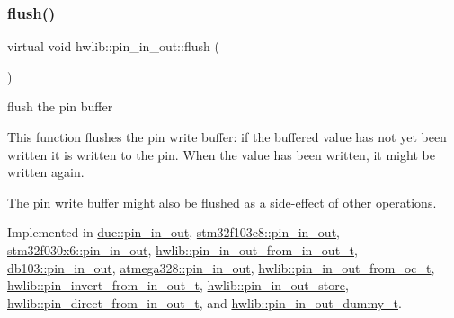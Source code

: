 \subsubsection{\texorpdfstring{flush()}{flush()}}
{\footnotesize\ttfamily virtual void hwlib\+::pin\+\_\+in\+\_\+out\+::flush (\begin{DoxyParamCaption}{ }\end{DoxyParamCaption})\hspace{0.3cm}{\ttfamily [pure virtual]}}

flush the pin buffer

This function flushes the pin write buffer\+: if the buffered value has not yet been written it is written to the pin. When the value has been written, it might be written again.

The pin write buffer might also be flushed as a side-\/effect of other operations. 

Implemented in \hyperlink{classdue_1_1pin__in__out_af138c21a34306d3421e0b961bf9406a1}{due\+::pin\+\_\+in\+\_\+out}, \hyperlink{classstm32f103c8_1_1pin__in__out_aae0b516a0f186e8f6be498af8b1ca238}{stm32f103c8\+::pin\+\_\+in\+\_\+out}, \hyperlink{classstm32f030x6_1_1pin__in__out_a89e04e9a27e2eab76739b4c9195abd34}{stm32f030x6\+::pin\+\_\+in\+\_\+out}, \hyperlink{classhwlib_1_1pin__in__out__from__in__out__t_a652dca78cb01191780f571b7f31e6e77}{hwlib\+::pin\+\_\+in\+\_\+out\+\_\+from\+\_\+in\+\_\+out\+\_\+t}, \hyperlink{classdb103_1_1pin__in__out_a7cfd446e8a7c4453345ac3ec53d386ce}{db103\+::pin\+\_\+in\+\_\+out}, \hyperlink{classatmega328_1_1pin__in__out_ab8c8298dc5d904dbc49f8b92e39abb7b}{atmega328\+::pin\+\_\+in\+\_\+out}, \hyperlink{classhwlib_1_1pin__in__out__from__oc__t_a69c975d51ed408a8abb62924c59e9cdb}{hwlib\+::pin\+\_\+in\+\_\+out\+\_\+from\+\_\+oc\+\_\+t}, \hyperlink{classhwlib_1_1pin__invert__from__in__out__t_ab8eefcc2f37559eb78935a72bcdd32ae}{hwlib\+::pin\+\_\+invert\+\_\+from\+\_\+in\+\_\+out\+\_\+t}, \hyperlink{classhwlib_1_1pin__in__out__store_ab937ad62722a0295a1829cf60d18b468}{hwlib\+::pin\+\_\+in\+\_\+out\+\_\+store}, \hyperlink{classhwlib_1_1pin__direct__from__in__out__t_a4c67e73e0fa9ac4e9a2c5917537eb98a}{hwlib\+::pin\+\_\+direct\+\_\+from\+\_\+in\+\_\+out\+\_\+t}, and \hyperlink{classhwlib_1_1pin__in__out__dummy__t_ab799d24ac3180d3d7e97512410ef9994}{hwlib\+::pin\+\_\+in\+\_\+out\+\_\+dummy\+\_\+t}.

\mbox{\label{classhwlib_1_1pin__in__out_a5caebc7ab9fe49b7e020b89f0a2cf892}} 
